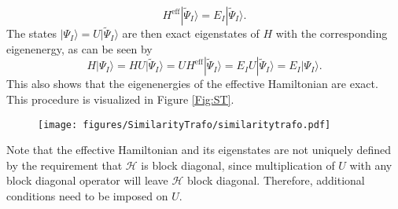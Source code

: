 	\begin{equation}
	{H^{{\text{eff}}}}|{\tilde \Psi _I}\rangle  = {E_I}|{\tilde \Psi _I}\rangle. 
	\end{equation} 	
The states $|{\Psi _I}\rangle  = U|{\tilde \Psi _I}\rangle $ are then exact eigenstates of $H$ with the corresponding eigenenergy, as can be seen by
	\begin{equation}
	H|{\Psi _I}\rangle  = HU|{\tilde \Psi _I}\rangle  = U{H^{{\text{eff}}}}|{\tilde \Psi _I}\rangle  = {E_I}U|{\tilde \Psi _I}\rangle  = {E_I}|{\Psi _I}\rangle. 
	\end{equation}
This also shows that the eigenenergies of the effective Hamiltonian are exact. This procedure is visualized in Figure \ref{Fig:ST}.
\begin{figure}
{\texttt{[image: figures/SimilarityTrafo/similaritytrafo.pdf]}}
\end{figure}
Note that the effective Hamiltonian and its eigenstates are not uniquely defined by the requirement that $\mathcal{H}$ is block diagonal, since multiplication of $U$ with any block diagonal operator will leave $\mathcal{H}$ block diagonal.\cite{ShaviR_1980_5711} Therefore, additional conditions need to be imposed on $U$.

